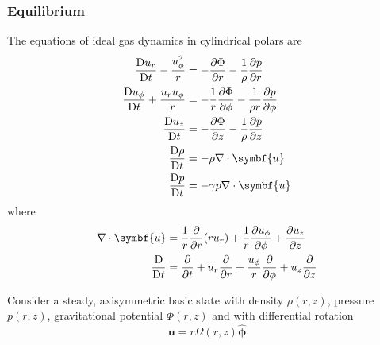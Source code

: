 \documentclass{jknotes}
\renewcommand{\u}{\symbf{u}}
\begin{document}
\subsubsection{Equilibrium}
The equations of ideal gas dynamics in cylindrical polars are
\begin{align}
	\frac{\diffD u_r}{\diffD t} - \frac{u_\phi^2}{r} &= -\frac{\partial
	\Phi}{\partial r} - \frac{1}{\rho} \frac{\partial p}{\partial r} \\
	\frac{\diffD u_\phi}{\diffD t} + \frac{u_r u_\phi}{r} &=
	-\frac{1}{r}\frac{\partial \Phi}{\partial \phi} - \frac{1}{\rho
	r}\frac{\partial p}{\partial \phi} \\
	\frac{\diffD u_z}{\diffD t} &= -\frac{\partial \Phi}{\partial z} -
	\frac{1}{\rho}\frac{\partial p}{\partial z} \\
	\frac{\diffD \rho}{\diffD t} &= -\rho \nabla \cdot \u \\
	\frac{\diffD p}{\diffD t} &= -\gamma p \nabla \cdot \u
\end{align}
where
\begin{align}
	\nabla \cdot \u &= \frac{1}{r}\frac{\partial}{\partial r}(ru_r) +
	\frac{1}{r}\frac{\partial u_\phi}{\partial \phi} + \frac{\partial
	u_z}{\partial z} \\
	\frac{\diffD}{\diffD t} &= \frac{\partial}{\partial t} + u_r
	\frac{\partial}{\partial r} + \frac{u_\phi}{r}\frac{\partial}{\partial
	\phi} + u_z\frac{\partial}{\partial z} 
\end{align}

Consider a steady, axisymmetric basic state with density $\rho(r,z)$, pressure
$p(r,z)$, gravitational potential $\Phi(r,z)$ and with differential rotation
\begin{equation}
	\u = r\Omega(r,z)\hat{\symbf{\phi}}
\end{equation}
\end{document}

